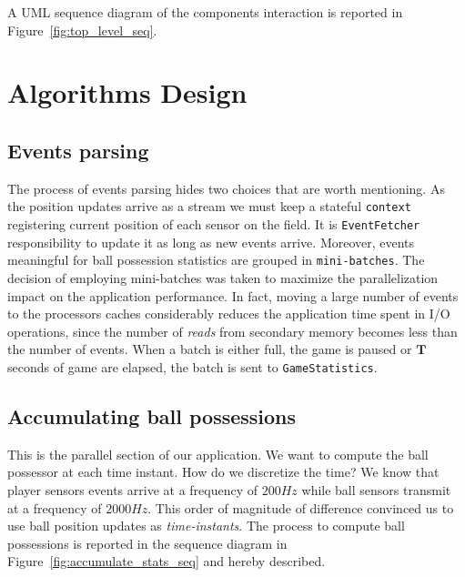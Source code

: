 \documentclass[a4paper, 11pt]{article}
\begin{document}
\begin{multicols}{2}
A UML sequence diagram of the components interaction is reported in Figure~\ref{fig:top_level_seq}.

\section{Algorithms Design}
\subsection{Events parsing}
The process of events parsing hides two choices that are worth mentioning. As the position updates arrive as a stream we must keep a stateful \texttt{context} registering current position of each sensor on the field. It is \texttt{EventFetcher} responsibility to update it as long as new events arrive. Moreover, events meaningful for ball possession statistics are grouped in \texttt{mini-batches}. The decision of employing mini-batches was taken to maximize the parallelization impact on the application performance. In fact, moving a large number of events to the processors caches considerably reduces the application time spent in I/O operations, since the number of \textit{reads} from secondary memory becomes less than the number of events. When a batch is either full, the game is paused or $\mathbf{T}$ seconds of game are elapsed, the batch is sent to \texttt{GameStatistics}.

\subsection{Accumulating ball possessions}
\label{sec:accumul}
This is the parallel section of our application. We want to compute the ball possessor at each time instant. How do we discretize the time? We know that player sensors events arrive at a frequency of $200Hz$ while ball sensors transmit at a frequency of $2000Hz$. This order of magnitude of difference convinced us to use ball position updates as \textit{time-instants}. The process to compute ball possessions is reported in the sequence diagram in Figure~\ref{fig:accumulate_stats_seq} and hereby described.


\end{multicols}
\end{document}
